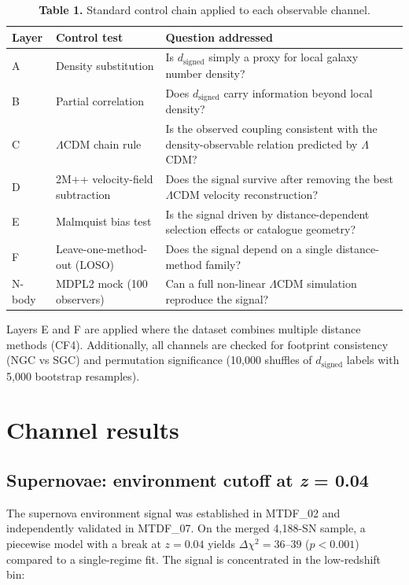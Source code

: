 \documentclass[11pt,a4paper]{article}
\begin{document}
\begin{table}[H]
\centering
\footnotesize
\caption{\textbf{Table 1.} Standard control chain applied to each observable channel.}
\begin{tabularx}{\linewidth}{l>{\RaggedRight\arraybackslash}X>{\RaggedRight\arraybackslash}X}
\toprule
\textbf{Layer} & \textbf{Control test} & \textbf{Question addressed} \tabularnewline
\midrule
A & Density substitution & Is \(d_\mathrm{signed}\) simply a proxy for local galaxy number density? \tabularnewline
B & Partial correlation & Does \(d_\mathrm{signed}\) carry information beyond local density? \tabularnewline
C & \(\Lambda\)CDM chain rule & Is the observed coupling consistent with the density-observable relation predicted by \(\Lambda\)CDM? \tabularnewline
D & 2M++ velocity-field subtraction & Does the signal survive after removing the best \(\Lambda\)CDM velocity reconstruction? \tabularnewline
E & Malmquist bias test & Is the signal driven by distance-dependent selection effects or catalogue geometry? \tabularnewline
F & Leave-one-method-out (LOSO) & Does the signal depend on a single distance-method family? \tabularnewline
N-body & MDPL2 mock (100 observers) & Can a full non-linear \(\Lambda\)CDM simulation reproduce the signal? \tabularnewline
\bottomrule
\end{tabularx}
\end{table}

Layers E and F are applied where the dataset combines multiple distance methods (CF4). Additionally, all channels are checked for footprint consistency (NGC vs SGC) and permutation significance (10,000 shuffles of \(d_\mathrm{signed}\) labels with 5,000 bootstrap resamples).

\section{Channel results}
\label{sec:sec5}

\subsection{Supernovae: environment cutoff at \emph{z} = 0.04}
The supernova environment signal was established in MTDF\_\allowbreak{}02 and independently validated in MTDF\_\allowbreak{}07. On the merged 4,188-SN sample, a piecewise model with a break at \(z = 0.04\) yields \(\Delta\chi^2 = 36\text{--}39\) (\(p < 0.001\)) compared to a single-regime fit. The signal is concentrated in the low-redshift bin:
\end{document}
